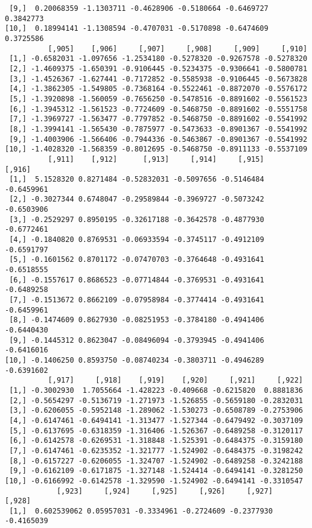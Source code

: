 \documentclass[
  letterpaper,
  DIV=11,
  numbers=noendperiod]{scrreprt}
\begin{document}
\begin{verbatim}
 [9,]  0.20068359 -1.1303711 -0.4628906 -0.5180664 -0.6469727  0.3842773
[10,]  0.18994141 -1.1308594 -0.4707031 -0.5170898 -0.6474609  0.3725586
          [,905]    [,906]     [,907]     [,908]     [,909]     [,910]
 [1,] -0.6582031 -1.097656 -1.2534180 -0.5278320 -0.9267578 -0.5278320
 [2,] -1.4609375 -1.650391 -0.9106445 -0.5234375 -0.9306641 -0.5800781
 [3,] -1.4526367 -1.627441 -0.7172852 -0.5585938 -0.9106445 -0.5673828
 [4,] -1.3862305 -1.549805 -0.7368164 -0.5522461 -0.8872070 -0.5576172
 [5,] -1.3920898 -1.560059 -0.7656250 -0.5478516 -0.8891602 -0.5561523
 [6,] -1.3945312 -1.561523 -0.7724609 -0.5468750 -0.8891602 -0.5551758
 [7,] -1.3969727 -1.563477 -0.7797852 -0.5468750 -0.8891602 -0.5541992
 [8,] -1.3994141 -1.565430 -0.7875977 -0.5473633 -0.8901367 -0.5541992
 [9,] -1.4003906 -1.566406 -0.7944336 -0.5463867 -0.8901367 -0.5541992
[10,] -1.4028320 -1.568359 -0.8012695 -0.5468750 -0.8911133 -0.5537109
          [,911]    [,912]      [,913]     [,914]     [,915]     [,916]
 [1,]  5.1528320 0.8271484 -0.52832031 -0.5097656 -0.5146484 -0.6459961
 [2,] -0.3027344 0.6748047 -0.29589844 -0.3969727 -0.5073242 -0.6503906
 [3,] -0.2529297 0.8950195 -0.32617188 -0.3642578 -0.4877930 -0.6772461
 [4,] -0.1840820 0.8769531 -0.06933594 -0.3745117 -0.4912109 -0.6591797
 [5,] -0.1601562 0.8701172 -0.07470703 -0.3764648 -0.4931641 -0.6518555
 [6,] -0.1557617 0.8686523 -0.07714844 -0.3769531 -0.4931641 -0.6489258
 [7,] -0.1513672 0.8662109 -0.07958984 -0.3774414 -0.4931641 -0.6459961
 [8,] -0.1474609 0.8627930 -0.08251953 -0.3784180 -0.4941406 -0.6440430
 [9,] -0.1445312 0.8623047 -0.08496094 -0.3793945 -0.4941406 -0.6416016
[10,] -0.1406250 0.8593750 -0.08740234 -0.3803711 -0.4946289 -0.6391602
          [,917]     [,918]    [,919]    [,920]     [,921]     [,922]
 [1,] -0.3002930  1.7055664 -1.428223 -0.409668 -0.6215820  0.8881836
 [2,] -0.5654297 -0.5136719 -1.271973 -1.526855 -0.5659180 -0.2832031
 [3,] -0.6206055 -0.5952148 -1.289062 -1.530273 -0.6508789 -0.2753906
 [4,] -0.6147461 -0.6494141 -1.313477 -1.527344 -0.6479492 -0.3037109
 [5,] -0.6137695 -0.6318359 -1.316406 -1.526367 -0.6489258 -0.3120117
 [6,] -0.6142578 -0.6269531 -1.318848 -1.525391 -0.6484375 -0.3159180
 [7,] -0.6147461 -0.6235352 -1.321777 -1.524902 -0.6484375 -0.3198242
 [8,] -0.6157227 -0.6206055 -1.324707 -1.524902 -0.6489258 -0.3242188
 [9,] -0.6162109 -0.6171875 -1.327148 -1.524414 -0.6494141 -0.3281250
[10,] -0.6166992 -0.6142578 -1.329590 -1.524902 -0.6494141 -0.3310547
            [,923]     [,924]     [,925]     [,926]     [,927]     [,928]
 [1,]  0.602539062 0.05957031 -0.3334961 -0.2724609 -0.2377930 -0.4165039

\end{verbatim}
\end{document}
